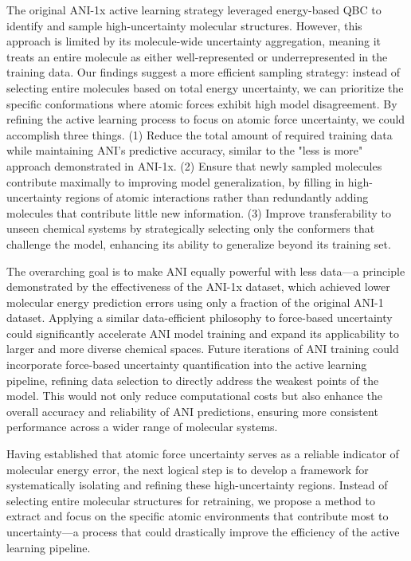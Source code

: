 The original ANI-1x active learning strategy \cite{ani-1x} leveraged energy-based QBC to identify and sample high-uncertainty molecular structures. However, this approach is limited by its molecule-wide uncertainty aggregation, meaning it treats an entire molecule as either well-represented or underrepresented in the training data. Our findings suggest a more efficient sampling strategy: instead of selecting entire molecules based on total energy uncertainty, we can prioritize the specific conformations where atomic forces exhibit high model disagreement. By refining the active learning process to focus on atomic force uncertainty, we could accomplish three things. (1) Reduce the total amount of required training data while maintaining ANI’s predictive accuracy, similar to the "less is more" approach demonstrated in ANI-1x. (2) Ensure that newly sampled molecules contribute maximally to improving model generalization, by filling in high-uncertainty regions of atomic interactions rather than redundantly adding molecules that contribute little new information. (3) Improve transferability to unseen chemical systems by strategically selecting only the conformers that challenge the model, enhancing its ability to generalize beyond its training set.

The overarching goal is to make ANI equally powerful with less data—a principle demonstrated by the effectiveness of the ANI-1x dataset, which achieved lower molecular energy prediction errors using only a fraction of the original ANI-1 dataset. Applying a similar data-efficient philosophy to force-based uncertainty could significantly accelerate ANI model training and expand its applicability to larger and more diverse chemical spaces. Future iterations of ANI training could incorporate force-based uncertainty quantification into the active learning pipeline, refining data selection to directly address the weakest points of the model. This would not only reduce computational costs but also enhance the overall accuracy and reliability of ANI predictions, ensuring more consistent performance across a wider range of molecular systems.

Having established that atomic force uncertainty serves as a reliable indicator of molecular energy error, the next logical step is to develop a framework for systematically isolating and refining these high-uncertainty regions. Instead of selecting entire molecular structures for retraining, we propose a method to extract and focus on the specific atomic environments that contribute most to uncertainty—a process that could drastically improve the efficiency of the active learning pipeline.

